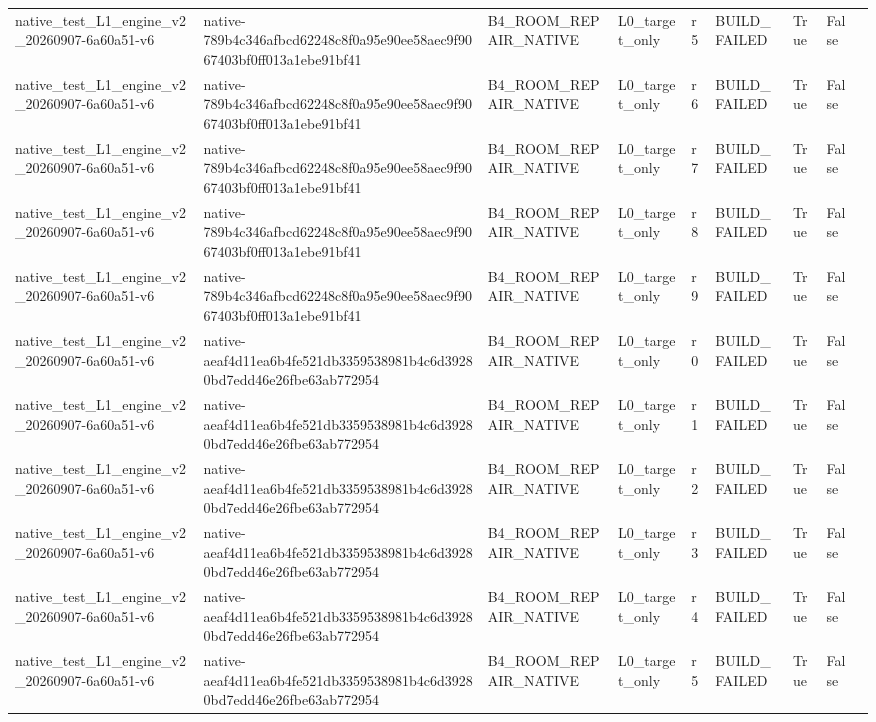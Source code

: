 \begin{tabular}{lllllllll}
native\_test\_L1\_engine\_v2\_20260907-6a60a51-v6 & native-789b4c346afbcd62248c8f0a95e90ee58aec9f9067403bf0ff013a1ebe91bf41 & B4\_ROOM\_REPAIR\_NATIVE & L0\_target\_only & r5 & BUILD\_FAILED & True & False &  \\
native\_test\_L1\_engine\_v2\_20260907-6a60a51-v6 & native-789b4c346afbcd62248c8f0a95e90ee58aec9f9067403bf0ff013a1ebe91bf41 & B4\_ROOM\_REPAIR\_NATIVE & L0\_target\_only & r6 & BUILD\_FAILED & True & False &  \\
native\_test\_L1\_engine\_v2\_20260907-6a60a51-v6 & native-789b4c346afbcd62248c8f0a95e90ee58aec9f9067403bf0ff013a1ebe91bf41 & B4\_ROOM\_REPAIR\_NATIVE & L0\_target\_only & r7 & BUILD\_FAILED & True & False &  \\
native\_test\_L1\_engine\_v2\_20260907-6a60a51-v6 & native-789b4c346afbcd62248c8f0a95e90ee58aec9f9067403bf0ff013a1ebe91bf41 & B4\_ROOM\_REPAIR\_NATIVE & L0\_target\_only & r8 & BUILD\_FAILED & True & False &  \\
native\_test\_L1\_engine\_v2\_20260907-6a60a51-v6 & native-789b4c346afbcd62248c8f0a95e90ee58aec9f9067403bf0ff013a1ebe91bf41 & B4\_ROOM\_REPAIR\_NATIVE & L0\_target\_only & r9 & BUILD\_FAILED & True & False &  \\
native\_test\_L1\_engine\_v2\_20260907-6a60a51-v6 & native-aeaf4d11ea6b4fe521db3359538981b4c6d39280bd7edd46e26fbe63ab772954 & B4\_ROOM\_REPAIR\_NATIVE & L0\_target\_only & r0 & BUILD\_FAILED & True & False &  \\
native\_test\_L1\_engine\_v2\_20260907-6a60a51-v6 & native-aeaf4d11ea6b4fe521db3359538981b4c6d39280bd7edd46e26fbe63ab772954 & B4\_ROOM\_REPAIR\_NATIVE & L0\_target\_only & r1 & BUILD\_FAILED & True & False &  \\
native\_test\_L1\_engine\_v2\_20260907-6a60a51-v6 & native-aeaf4d11ea6b4fe521db3359538981b4c6d39280bd7edd46e26fbe63ab772954 & B4\_ROOM\_REPAIR\_NATIVE & L0\_target\_only & r2 & BUILD\_FAILED & True & False &  \\
native\_test\_L1\_engine\_v2\_20260907-6a60a51-v6 & native-aeaf4d11ea6b4fe521db3359538981b4c6d39280bd7edd46e26fbe63ab772954 & B4\_ROOM\_REPAIR\_NATIVE & L0\_target\_only & r3 & BUILD\_FAILED & True & False &  \\
native\_test\_L1\_engine\_v2\_20260907-6a60a51-v6 & native-aeaf4d11ea6b4fe521db3359538981b4c6d39280bd7edd46e26fbe63ab772954 & B4\_ROOM\_REPAIR\_NATIVE & L0\_target\_only & r4 & BUILD\_FAILED & True & False &  \\
native\_test\_L1\_engine\_v2\_20260907-6a60a51-v6 & native-aeaf4d11ea6b4fe521db3359538981b4c6d39280bd7edd46e26fbe63ab772954 & B4\_ROOM\_REPAIR\_NATIVE & L0\_target\_only & r5 & BUILD\_FAILED & True & False &  \\

\end{tabular}
